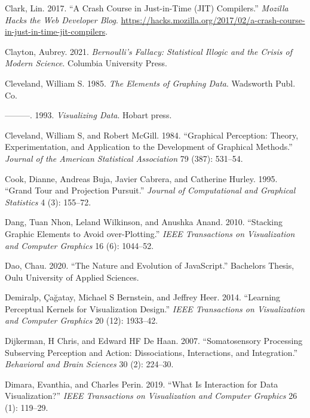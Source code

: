 \documentclass[
]{book}
\newlength{\cslhangindent}
\newenvironment{CSLReferences}[2] %
 {\begin{list}{}{%
  \setlength{\itemindent}{0pt}
  \setlength{\leftmargin}{0pt}
  \setlength{\parsep}{0pt}
  \ifodd #1
   \setlength{\leftmargin}{\cslhangindent}
   \setlength{\itemindent}{-1\cslhangindent}
  \fi
  \setlength{\itemsep}{#2\baselineskip}}}
 {\end{list}}
\begin{document}
\begin{CSLReferences}{1}{0}
Clark, Lin. 2017. {``A Crash Course in Just-in-Time (JIT) Compilers.''} \emph{Mozilla Hacks {\textendash} the Web Developer Blog}. \url{https://hacks.mozilla.org/2017/02/a-crash-course-in-just-in-time-jit-compilers}.

Clayton, Aubrey. 2021. \emph{Bernoulli's Fallacy: Statistical Illogic and the Crisis of Modern Science}. Columbia University Press.

Cleveland, William S. 1985. \emph{The Elements of Graphing Data}. Wadsworth Publ. Co.

---------. 1993. \emph{Visualizing Data}. Hobart press.

Cleveland, William S, and Robert McGill. 1984. {``Graphical Perception: Theory, Experimentation, and Application to the Development of Graphical Methods.''} \emph{Journal of the American Statistical Association} 79 (387): 531--54.

Cook, Dianne, Andreas Buja, Javier Cabrera, and Catherine Hurley. 1995. {``Grand Tour and Projection Pursuit.''} \emph{Journal of Computational and Graphical Statistics} 4 (3): 155--72.

Dang, Tuan Nhon, Leland Wilkinson, and Anushka Anand. 2010. {``Stacking Graphic Elements to Avoid over-Plotting.''} \emph{IEEE Transactions on Visualization and Computer Graphics} 16 (6): 1044--52.

Dao, Chau. 2020. {``The Nature and Evolution of JavaScript.''} Bachelor\textquotesingle s Thesis, Oulu University of Applied Sciences.

Demiralp, Çağatay, Michael S Bernstein, and Jeffrey Heer. 2014. {``Learning Perceptual Kernels for Visualization Design.''} \emph{IEEE Transactions on Visualization and Computer Graphics} 20 (12): 1933--42.

Dijkerman, H Chris, and Edward HF De Haan. 2007. {``Somatosensory Processing Subserving Perception and Action: Dissociations, Interactions, and Integration.''} \emph{Behavioral and Brain Sciences} 30 (2): 224--30.

Dimara, Evanthia, and Charles Perin. 2019. {``What Is Interaction for Data Visualization?''} \emph{IEEE Transactions on Visualization and Computer Graphics} 26 (1): 119--29.


\end{CSLReferences}
\end{document}
